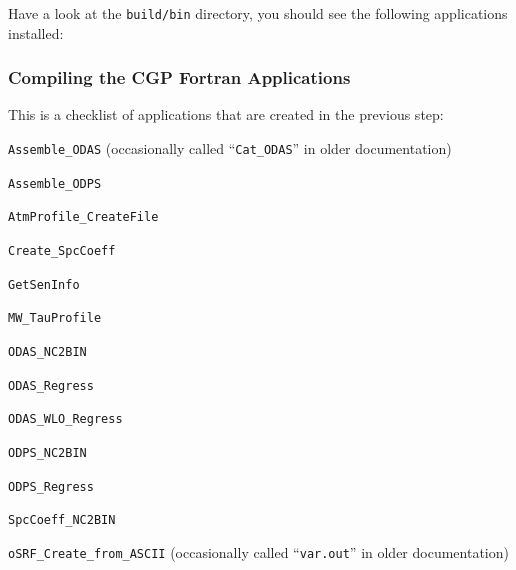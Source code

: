 Have a look at the \verb|build/bin| directory, you should see the following applications installed:

\subsubsection{Compiling the CGP Fortran Applications}
This is a checklist of applications that are created in the previous step:
\begin{todolist}

\item \verb|Assemble_ODAS|  (occasionally called ``\verb|Cat_ODAS|'' in older documentation)
\item \verb|Assemble_ODPS|
\item \verb|AtmProfile_CreateFile|
\item \verb|Create_SpcCoeff|
\item \verb|GetSenInfo|
\item \verb|MW_TauProfile|
\item \verb|ODAS_NC2BIN|
\item \verb|ODAS_Regress|
\item \verb|ODAS_WLO_Regress|
\item \verb|ODPS_NC2BIN|
\item \verb|ODPS_Regress|
\item \verb|SpcCoeff_NC2BIN|
\item \verb|oSRF_Create_from_ASCII| (occasionally called ``\verb|var.out|'' in older documentation)

\end{todolist}


